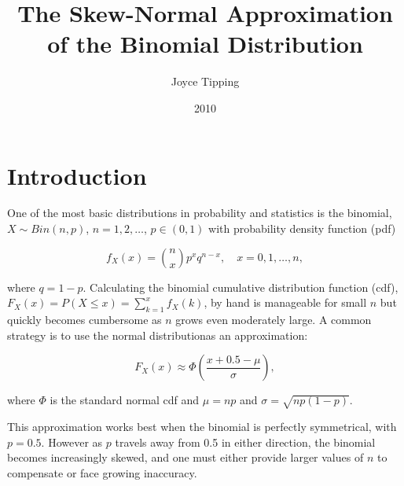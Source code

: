 \documentclass{article}
\begin{document}
\title{The Skew-Normal Approximation of the Binomial Distribution}
\author{Joyce Tipping}
\date{2010}
\maketitle

\section{Introduction}

One of the most basic distributions in probability and statistics is the
binomial, $X \sim Bin(n,p)$, $n = 1, 2, \ldots$, $p \in (0, 1)$ with
probability density function (pdf)

\begin{equation*}
  f_X(x) = \binom{n}{x} p^x q^{n-x}, \quad x = 0, 1, \ldots, n,
\end{equation*}

where $q=1-p$. Calculating the binomial cumulative distribution function (cdf),
$F_X(x) = P(X \leq x) = \sum_{k=1}^x f_X(k)$, by hand is manageable for small
$n$ but quickly becomes cumbersome as $n$ grows even moderately large. A common
strategy is to use the normal distribution\footnotemark as an approximation:


\begin{equation}
  F_X(x) \approx \Phi \left( \frac{x + 0.5 - \mu}{\sigma} \right),
\end{equation}

where $\Phi$ is the standard normal cdf and $\mu = np$ and $\sigma =
\sqrt{np(1-p)}$.

This approximation works best when the binomial is perfectly symmetrical, with
$p=0.5$. However as $p$ travels away from 0.5 in either direction, the binomial
becomes increasingly skewed, and one must either provide larger values of $n$
to compensate or face growing inaccuracy.
\end{document}
